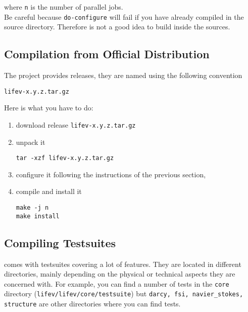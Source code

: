\noindent where \verb!n! is the number of parallel jobs.\\
Be careful because \verb!do-configure! will fail if you have already compiled
\lifev in the source directory. Therefore is not a good idea to build inside the sources.

\subsection{Compilation from Official Distribution}
\label{sec:comp-from-offic}
The \lifev project provides releases, they are named using the following convention
\begin{center}
\verb!lifev-x.y.z.tar.gz!
\end{center}

Here is what you have to do:

\begin{enumerate}
\item download \lifev release \verb!lifev-x.y.z.tar.gz!
\item unpack it
\begin{lstlisting}
tar -xzf lifev-x.y.z.tar.gz
\end{lstlisting}
\item configure it following the instructions of the previous section,
\item compile and install it
\begin{lstlisting}
make -j n
make install
\end{lstlisting}
\end{enumerate}


\subsection{Compiling Testsuites}

\noindent \lifev comes with testsuites covering a lot of features. They are located in different directories, mainly depending on the physical or technical aspects they are concerned with. For example, you can find a number of tests in the \verb+core+
directory (\verb+lifev/lifev/core/testsuite+) but \verb+darcy, fsi, navier_stokes, structure+ are other directories where you can find tests.%

